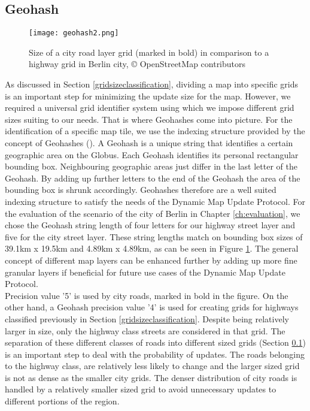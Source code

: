 \subsection{Geohash}\label{geohashsizes}
\begin{figure}
\texttt{[image: geohash2.png]}
\caption{Size of a city road layer grid (marked in bold) in comparison to a highway grid in Berlin city, {\copyright} OpenStreetMap contributors}
\label{fg:geohash}
\end{figure}
As discussed in Section \ref{gridsizeclassification}, dividing a map into specific grids is an important step for minimizing the update size for the map. However, we required a universal grid identifier system using which we impose different grid sizes suiting to our needs. That is where Geohashes come into picture. For the identification of a specific map tile, we use the indexing structure provided by the concept of Geohashes (\citet{suwardi2015geohash}). A Geohash is a unique string that identifies a certain geographic area on the Globus. Each Geohash identifies its personal rectangular bounding box. Neighbouring geographic areas just differ in the last letter of the Geohash. By adding up further letters to the end of the Geohash the area of the bounding box is shrunk accordingly. Geohashes therefore are a well suited indexing structure to satisfy the needs of the Dynamic Map Update Protocol. For the evaluation of the scenario of the city of Berlin in Chapter \ref{ch:evaluation}, we chose the Geohash string length of four letters for our highway street layer and five for the city street layer. These string lengths match on bounding box sizes of 39.1km x 19.5km and 4.89km x 4.89km, as can be seen in Figure \ref{fg:geohash}. The general concept of different map layers can be enhanced further by adding up more fine granular layers if beneficial for future use cases of the Dynamic Map Update Protocol. \\

Precision value '5' is used by city roads, marked in bold in the figure. On the other hand, a Geohash precision value '4' is used for creating grids for highways classified previously in Section \ref{gridsizeclassification}. Despite being relatively larger in size, only the highway class streets are considered in that grid. The separation of these different classes of roads into different sized grids (Section \ref{geohashsizes}) is an important step to deal with the probability of updates. The roads belonging to the highway class, are relatively less likely to change and the larger sized grid is not as dense as the smaller city grids. The denser distribution of city roads is handled by a relatively smaller sized grid to avoid unnecessary updates to different portions of the region. 

